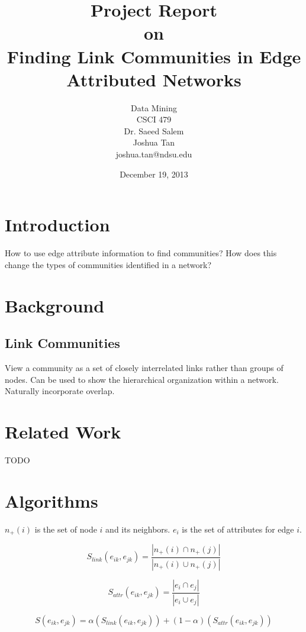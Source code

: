 \documentclass{report} %
\title{Project Report\\[0.5em]{\Large on}\\[0.5em]Finding Link Communities in Edge Attributed Networks}
\author{Data Mining\\CSCI 479\\Dr. Saeed Salem\\[1em] Joshua Tan\\joshua.tan@ndsu.edu}
\date{December 19, 2013}
\begin{document}
\maketitle

\section*{Introduction}

How to use edge attribute information to find communities? How does this change the types of communities identified in a network?

\section*{Background}

\subsection*{Link Communities}

View a community as a set of closely interrelated links rather than groups of nodes. Can be used to show the hierarchical organization within a network. Naturally incorporate overlap.

\section*{Related Work}

TODO

\section*{Algorithms}

$n_+(i)$ is the set of node $i$ and its neighbors. $e_i$ is the set of  attributes for edge $i$.

\begin{equation}
  S_{link}(e_{ik},e_{jk}) = \frac{|n_+(i) \cap n_+(j)|}{|n_+(i) \cup n_+(j)|}
\end{equation}

\begin{equation}
  S_{attr}(e_{ik},e_{jk}) = \frac{|e_i \cap e_j|}{|e_i \cup e_j|}
\end{equation}

\begin{equation}
  S(e_{ik},e_{jk}) = \alpha (S_{link}(e_{ik},e_{jk})) + (1-\alpha)(S_{attr}(e_{ik},e_{jk}))
\end{equation}
\end{document}
